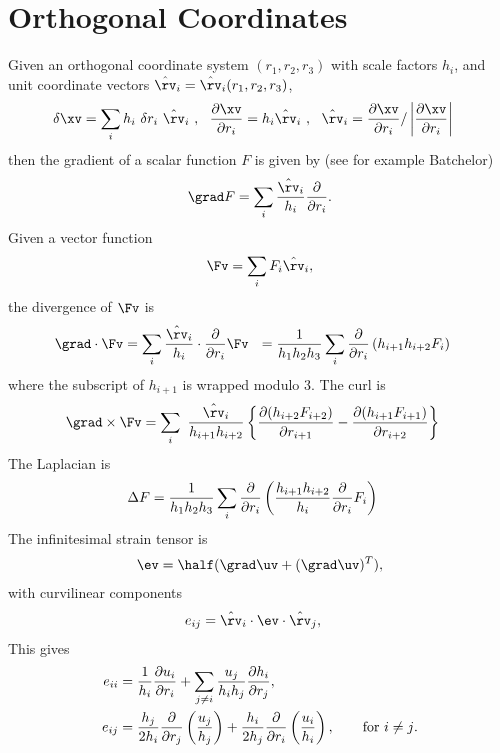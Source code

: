 \newcommand{\rvh}{\hat{\rv}}
\section{Orthogonal Coordinates}

Given an orthogonal coordinate system $(r_1,r_2,r_3)$ with scale factors $h_i$, and
unit coordinate vectors $\rvh_i=\rvh_i(r_1,r_2,r_3)$, 
\begin{align*}
    \delta \xv &= \sum_i h_i ~\delta r_i~ \rvh_i  ~,~~
    {\partial \xv \over \partial r_i} = h_i \rvh_i ~,~~
    \rvh_i = { {\partial \xv \over \partial r_i} / \left\vert {\partial \xv \over \partial r_i}\right\vert }
\end{align*}
then the gradient of a scalar function $F$ is given by (see for example Batchelor\cite{BatchelorFluidDynamicsBook})
\begin{align*}
   \grad F = \sum_i  {\rvh_i\over h_i}{\partial \over \partial r_i} . 
\end{align*}
Given a vector function
\[
  \Fv = \sum_i F_i \rvh_i, 
\]
the divergence of $\Fv$ is 
\begin{align*}
   \grad \cdot \Fv &= \sum_i { \rvh_i\over h_i}\cdot{\partial \over \partial r_i} \Fv ~~
               = {1\over h_1 h_2 h_3} 
                  \sum_i {\partial\over\partial r_i}\left( h_{i+1} h_{i+2} F_i \right) 
\end{align*}
where the subscript of $h_{i+1}$ is wrapped modulo 3. 
The curl is
\begin{align*}
   \grad \times \Fv &= \sum_i ~{\rvh_i\over h_{i+1} h_{i+2}} \left\{ 
            {\partial(h_{i+2}F_{i+2}) \over\partial r_{i+1}} - 
            {\partial(h_{i+1}F_{i+1}) \over\partial r_{i+2}}  \right\}
\end{align*}
The Laplacian is
\begin{align*}
   \Delta F &= {1\over h_1 h_2 h_3} 
      \sum_i {\partial\over\partial r_i}\left( {h_{i+1} h_{i+2}\over h_i}{\partial\over\partial r_i} F_i \right) 
\end{align*}
% 
The infinitesimal strain tensor is 
\begin{align*}
    \ev = \half( \grad\uv + (\grad\uv)^T ) ,
\end{align*}
with curvilinear components 
\begin{align*}
    e_{ij} &= \rvh_i \cdot \ev \cdot \rvh_j ,
\end{align*}
This gives
\begin{align*}
  e_{ii} &= {1\over h_i} {\partial u_i\over \partial r_i} +
                 \sum_{j\ne i} {u_{j}\over h_i h_{j}}{\partial h_i \over\partial r_j} , \\
  e_{ij} &= {h_j\over 2 h_i}{\partial \over \partial r_j}\left({u_j\over h_j}\right) +
            {h_i\over 2 h_j}{\partial \over \partial r_i}\left({u_i\over h_i}\right), \qquad\text{for $i\ne j$}. 
\end{align*}
